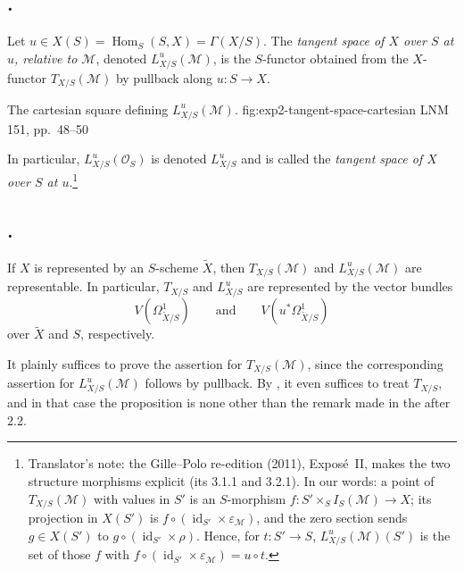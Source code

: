 \subsection*{.}
Let \(u\in X(S)=\operatorname{Hom}_S(S,X)=\Gamma(X/S)\). The
\emph{tangent space of \(X\) over \(S\) at \(u\), relative to
\(\mathcal M\)}, denoted \(L^u_{X/S}(\mathcal M)\), is the \(S\)-functor
obtained from the \(X\)-functor \(T_{X/S}(\mathcal M)\) by pullback along
\(u:S\to X\).

  {The cartesian square defining \(L^u_{X/S}(\mathcal M)\).}
  {fig:exp2-tangent-space-cartesian}
  {LNM 151, pp.~48--50}

In particular, \(L^u_{X/S}(\mathcal O_S)\) is denoted \(L^u_{X/S}\) and
is called the \emph{tangent space of \(X\) over \(S\) at \(u\)}.\footnote{Translator's
note: the Gille--Polo re-edition (2011), Expos\'e~II, makes the two
structure morphisms explicit (its 3.1.1 and 3.2.1). In our words: a point of
\(T_{X/S}(\mathcal M)\) with values in \(S'\) is an \(S\)-morphism
\(f\colon S'\times_SI_S(\mathcal M)\to X\); its projection in \(X(S')\) is
\(f\circ(\operatorname{id}_{S'}\times\varepsilon_{\mathcal M})\), and the
zero section sends \(g\in X(S')\) to
\(g\circ(\operatorname{id}_{S'}\times\rho)\). Hence, for \(t\colon S'\to S\),
\(L^u_{X/S}(\mathcal M)(S')\) is the set of those \(f\) with
\(f\circ(\operatorname{id}_{S'}\times\varepsilon_{\mathcal M})=u\circ t\).}

\subsection*{.}
If \(X\) is represented by an \(S\)-scheme \(\widetilde X\), then
\(T_{X/S}(\mathcal M)\) and \(L^u_{X/S}(\mathcal M)\) are representable.
In particular, \(T_{X/S}\) and \(L^u_{X/S}\) are represented by the
vector bundles
\[
  V(\Omega^1_{\widetilde X/S})
  \qquad\text{and}\qquad
  V(u^*\Omega^1_{\widetilde X/S})
\]
over \(\widetilde X\) and \(S\), respectively.

It plainly suffices to prove the assertion for \(T_{X/S}(\mathcal M)\),
since the corresponding assertion for \(L^u_{X/S}(\mathcal M)\) follows
by pullback. By , it even suffices to treat \(T_{X/S}\),
and in that case the proposition is none other than the remark made in the
 after 2.2.

